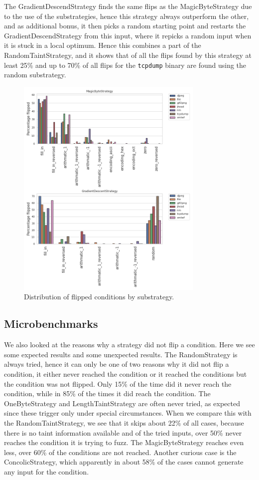 The GradientDescendStrategy finds the same flips as the MagicByteStrategy due to the use of the substrategies, hence this strategy always outperform the other, and as additional bonus, it then picks a random starting point and restarts the GradientDescendStrategy from this input, where it repicks a random input when it is stuck in a local optimum. Hence this combines a part of the RandomTaintStrategy, and it shows that of all the flips found by this strategy at least 25\% and up to 70\% of all flips for the \texttt{tcpdump} binary are found using the random substrategy.
\begin{figure}[H]
    \centering
    \includegraphics[width=0.8\textwidth]{5_results/graphs_new/substrategy_overview.png}  
    \caption{Distribution of flipped conditions by substrategy.}
    \label{fig:substrategies}
\end{figure}

\subsection{Microbenchmarks}
We also looked at the reasons why a strategy did not flip a condition. Here we see some expected results and some unexpected results.
The RandomStrategy is always tried, hence it can only be one of two reasons why it did not flip a condition, it either never reached the condition or it reached the conditions but the condition was not flipped. Only 15\% of the time did it never reach the condition, while in 85\% of the times it did reach the condition. The OneByteStrategy and LengthTaintStrategy are often never tried, as expected since these trigger only under special circumstances.
When we compare this with the RandomTaintStrategy, we see that it skips about 22\% of all cases, because there is no taint information available and of the tried inputs, over 50\% never reaches the condition it is trying to fuzz. The MagicByteStrategy reaches even less, over 60\% of the conditions are not reached.
Another curious case is the ConcolicStrategy, which apparently in about 58\% of the cases cannot generate any input for the condition.


